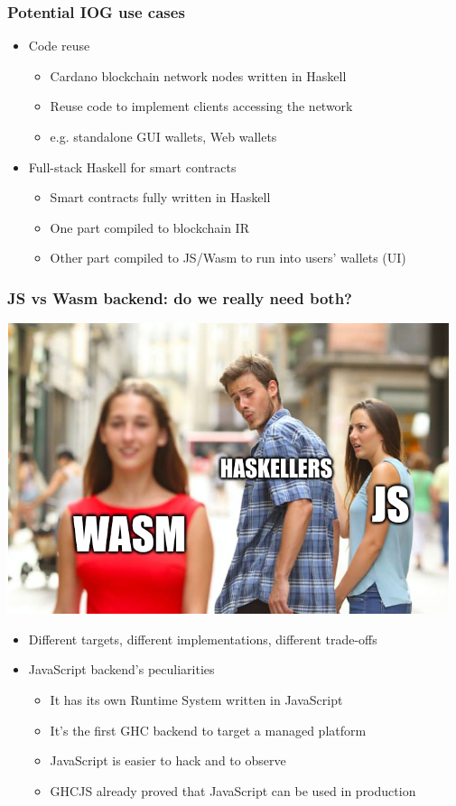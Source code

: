 \documentclass[aspectratio=169]{beamer}
\begin{document}
\begin{frame}
\frametitle{Potential IOG use cases}
\begin{itemize}
\item Code reuse
\begin{itemize}
\item Cardano blockchain network nodes written in Haskell
\item Reuse code to implement clients accessing the network
\item e.g. standalone GUI wallets, Web wallets
\end{itemize}
\item Full-stack Haskell for smart contracts
\begin{itemize}
\item Smart contracts fully written in Haskell
\item One part compiled to blockchain IR
\item Other part compiled to JS/Wasm to run into users’ wallets (UI)
\end{itemize}
\end{itemize}
\end{frame}


\begin{frame}
\frametitle{ JS vs Wasm backend: do we really need both?}
\begin{center}
\includegraphics[scale=0.2]{images/js_vs_wasm.png}
\end{center}
\begin{itemize}
\item Different targets, different implementations, different trade-offs
\item JavaScript backend’s peculiarities
\begin{itemize}
\item It has its own Runtime System written in JavaScript
\item It’s the first GHC backend to target a managed platform
\item JavaScript is easier to hack and to observe
\item GHCJS already proved that JavaScript can be used in production
\end{itemize}
\end{itemize}
\end{frame}
\end{document}
